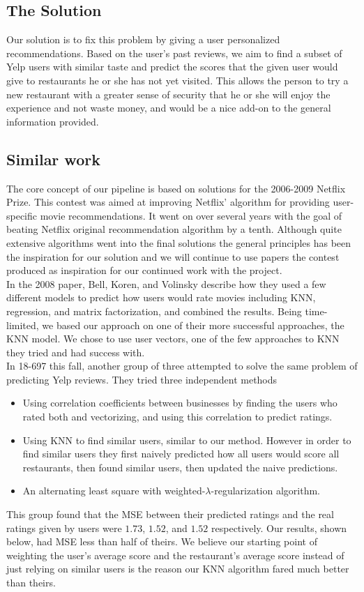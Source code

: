 \documentclass[10pt,twocolumn,letterpaper]{article}
\begin{document}
\subsection{The Solution}
Our solution is to fix this problem by giving a user personalized recommendations. Based on the user's past reviews, we aim to find a subset of Yelp users with similar taste and predict the scores that the given user would give to restaurants he or she has not yet visited. This allows the person to try a new restaurant with a greater sense of security that he or she will enjoy the experience and not waste money, and would be a nice add-on to the general information provided.
\subsection{Similar work}
The core concept of our pipeline is based on solutions for the 2006-2009 Netflix Prize. This contest was aimed at improving Netflix' algorithm for providing user-specific movie recommendations. It went on over several years with the goal of beating Netflix original recommendation algorithm by a tenth. Although quite extensive algorithms went into the final solutions the general principles has been the inspiration for our solution and we will continue to use papers the contest produced as inspiration for our continued work with the project\cite{KorBell}\cite{BellKor}.\\
\indent In the 2008 paper, Bell, Koren, and Volinsky describe how they used a few different models to predict how users would rate movies including KNN, regression, and matrix factorization, and combined the results. Being time-limited, we based our approach on one of their more successful approaches, the KNN model. We chose to use user vectors, one of the few approaches to KNN they tried and had success with.\\
\indent In 18-697 this fall, another group of three attempted to solve the same problem of predicting Yelp reviews. They tried three independent methods\cite{ClassPresentation}
\begin{itemize}
\item Using correlation coefficients between businesses by finding the users who rated both and vectorizing, and using this correlation to predict ratings.
\item Using KNN to find similar users, similar to our method. However in order to find similar users they first naively predicted how all users would score all restaurants, then found similar users, then updated the naive predictions.
\item An alternating least square with weighted-$\lambda$-regularization algorithm.
\end{itemize}
This group found that the MSE between their predicted ratings and the real ratings given by users were $1.73$, $1.52$, and $1.52$ respectively. Our results, shown below, had MSE less than half of theirs. We believe our starting point of weighting the user's average score and the restaurant's average score instead of just relying on similar users is the reason our KNN algorithm fared much better than theirs.
\end{document}
